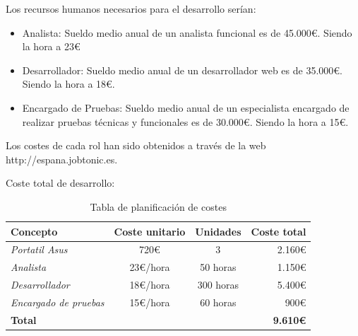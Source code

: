 Los recursos humanos necesarios para el desarrollo serían:

\begin{itemize}
    \item Analista: Sueldo medio anual de un analista funcional es de 45.000€. Siendo la
        hora a 23€
    \item Desarrollador: Sueldo medio anual de un desarrollador web es de 35.000€.
        Siendo la hora a 18€.
    \item Encargado de Pruebas: Sueldo medio anual de un especialista encargado de
        realizar pruebas técnicas y funcionales es de 30.000€. Siendo la hora a 15€.
\end{itemize}

Los costes de cada rol han sido obtenidos a través de la web http://espana.jobtonic.es.

Coste total de desarrollo:

\begin{table}[hbtp]
  \centering
  \begin{tabular}[h]{|l|c|c|r|}
    \hline
    \textbf{Concepto} & \textbf{Coste unitario} & \textbf{Unidades} & \textbf{Coste total} \\
    \hline
    \textit{Portatil Asus} & 720€ & 3 & 2.160€ \\
    \hline
    \textit{Analista} & 23€/hora & 50 horas & 1.150€ \\
    \hline
    \textit{Desarrollador} & 18€/hora & 300 horas & 5.400€ \\
    \hline
    \textit{Encargado de pruebas} & 15€/hora & 60 horas & 900€ \\
    \hline
    \textbf{Total} & & & \textbf{9.610€} \\
    \hline
  \end{tabular}
  \caption{Tabla de planificación de costes}
  \label{tab:costes}
\end{table}
